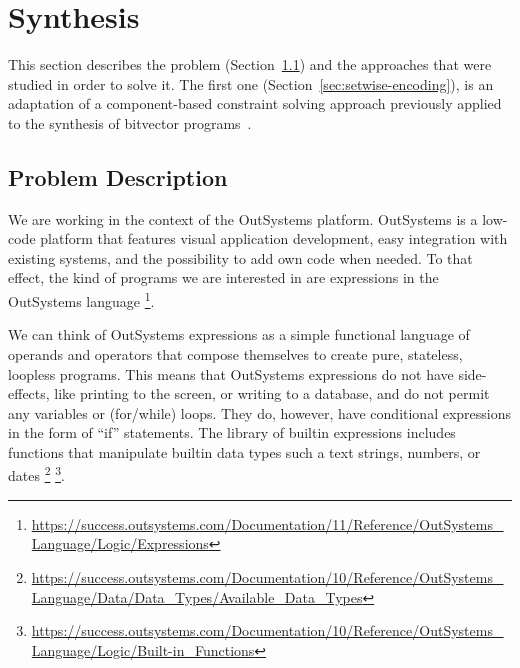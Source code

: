 \section{Synthesis}
\label{sec:synthesis}

This section describes the problem (Section~\ref{sec:problem-description}) and
the approaches that were studied in order to solve it. The first one
(Section~\ref{sec:setwise-encoding}), is an adaptation of a component-based
constraint solving approach previously applied to the synthesis of bitvector
programs~\cite{Gulwani:2011:SLP, Jha:oracle:2010}.

\subsection{Problem Description}
\label{sec:problem-description}

We are working in the context of the OutSystems platform. OutSystems is a
low-code platform that features visual application development, easy integration
with existing systems, and the possibility to add own code when needed. To that
effect, the kind of programs we are interested in are expressions in the
OutSystems language
\footnote{\url{https://success.outsystems.com/Documentation/11/Reference/OutSystems_Language/Logic/Expressions}}.

We can think of OutSystems expressions as a simple functional language of
operands and operators that compose themselves to create pure, stateless,
loopless programs. This means that OutSystems expressions do not have
side-effects, like printing to the screen, or writing to a database, and do not
permit any variables or (for/while) loops. They do, however, have conditional
expressions in the form of ``if'' statements. The library of builtin expressions
includes functions that manipulate builtin data types such a text strings,
numbers, or dates
\footnote{\url{https://success.outsystems.com/Documentation/10/Reference/OutSystems_Language/Data/Data_Types/Available_Data_Types}}
\footnote{\url{https://success.outsystems.com/Documentation/10/Reference/OutSystems_Language/Logic/Built-in_Functions}}.


